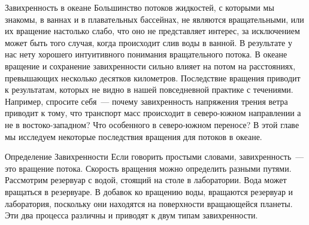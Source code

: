 
\begin{chapter}{Завихренность в океане}\label{chap:12}
Большинство потоков жидкостей, с которыми мы знакомы, в ваннах и в
плавательных бассейнах, не являются вращательными, или их вращение
настолько слабо, что оно не представляет интерес, за исключением может
быть того случая, когда происходит слив воды в ванной. В результате у
нас нету хорошего интуитивного понимания вращательного потока. В
океане вращение и сохранение завихренности сильно влияет на потом на
расстояниях, превышающих несколько десятков километров. Последствие
вращения приводит к результатам, которых не видно в нашей повседневной
практике с течениями. Например, спросите себя~--- почему
завихренность напряжения трения ветра приводит к тому, что транспорт
масс происходит в северо-южном направлении а не в востоко-западном?
Что особенного в северо-южном переносе? В этой главе мы исследуем
некоторые последствия вращения для потоков в океане.
%

\begin{section}{Определение Завихренности}
Если говорить простыми словами, завихренность~--- это вращение
потока. Скорость вращения можно определить разными путями. Рассмотрим
резервуар с водой, стоящий на столе в лаборатории. Вода может
вращаться в резервуаре. В добавок ко вращению воды, вращаются
резервуар и лаборатория, поскольку они находятся на поверхности
вращающейся планеты. Эти два процесса различны и приводят к двум типам
завихренности.
%


\end{section}
\end{chapter}
